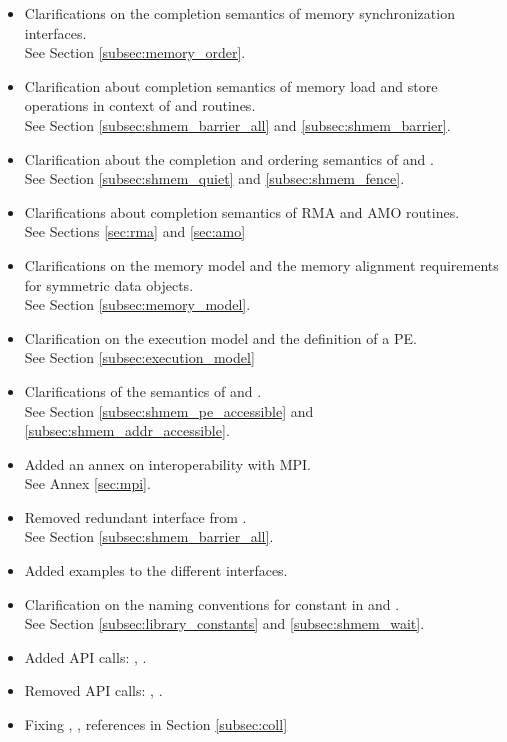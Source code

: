 \begin{itemize}
\item Clarifications on the completion semantics of memory synchronization 
interfaces.\\See Section \ref{subsec:memory_order}.
\item Clarification about completion semantics of memory load and store 
operations in context of  and 
routines.\\See Section \ref{subsec:shmem_barrier_all} and \ref{subsec:shmem_barrier}.
\item Clarification about the completion and ordering semantics of  and .
\\See Section \ref{subsec:shmem_quiet} and \ref{subsec:shmem_fence}.
\item Clarifications about completion semantics of \ac{RMA} and \ac{AMO} routines.
\\See Sections \ref{sec:rma} and \ref{sec:amo}
\item Clarifications on the memory model and the memory alignment requirements for symmetric data objects.
\\See Section \ref{subsec:memory_model}.
\item Clarification on the execution model and the definition of a \ac{PE}.
\\See Section \ref{subsec:execution_model}
\item Clarifications of the semantics of  and .
\\See Section \ref{subsec:shmem_pe_accessible} and \ref{subsec:shmem_addr_accessible}.
\item Added an annex on interoperability with \ac{MPI}.\\See Annex \ref{sec:mpi}.
\item Removed redundant interface  from .\\See Section \ref{subsec:shmem_barrier_all}.
\item Added examples to the different interfaces.
\item Clarification on the naming conventions for constant in \Clang{} and \Fortran{}.
\\See Section \ref{subsec:library_constants} and \ref{subsec:shmem_wait}.
\item Added \ac{API} calls: , . 
\item Removed \ac{API} calls: , . 
\item Fixing , ,  references 
in Section \ref{subsec:coll}
\end{itemize}
